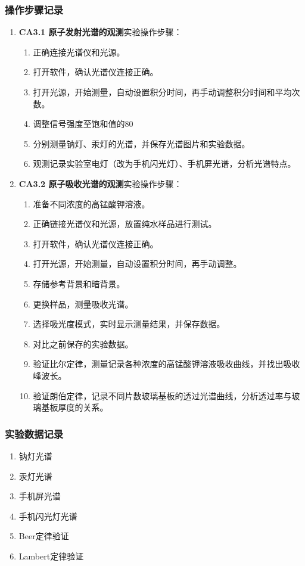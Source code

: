 \documentclass[dvipsnames, svgnames,a4paper,11pt]{article}
\begin{document}
	\subsubsection{操作步骤记录}
	\begin{enumerate}
		\item \textbf{CA3.1 原子发射光谱的观测}实验操作步骤：
		\begin{enumerate}
			\item 正确连接光谱仪和光源。
			\item 打开软件，确认光谱仪连接正确。
			\item 打开光源，开始测量，自动设置积分时间，再手动调整积分时间和平均次数。
			\item 调整信号强度至饱和值的80%
			\item 分别测量钠灯、汞灯的光谱，并保存光谱图片和实验数据。
			\item 观测记录实验室电灯（改为手机闪光灯）、手机屏光谱，分析光谱特点。
		\end{enumerate}
				
		\item \textbf{CA3.2 原子吸收光谱的观测}实验操作步骤：
		\begin{enumerate}
			\item 准备不同浓度的高锰酸钾溶液。
			\item 正确链接光谱仪和光源，放置纯水样品进行测试。
			\item 打开软件，确认光谱仪连接正确。
			\item 打开光源，开始测量，自动设置积分时间，再手动调整。
			\item 存储参考背景和暗背景。
			\item 更换样品，测量吸收光谱。
			\item 选择吸光度模式，实时显示测量结果，并保存数据。
			\item 对比之前保存的实验数据。
			\item 验证比尔定律，测量记录各种浓度的高锰酸钾溶液吸收曲线，并找出吸收峰波长。
			\item 验证朗伯定律，记录不同片数玻璃基板的透过光谱曲线，分析透过率与玻璃基板厚度的关系。
		\end{enumerate}
	\end{enumerate}	
	
	\subsubsection{实验数据记录}
	\begin{enumerate}
		\item 钠灯光谱
		\item 汞灯光谱
		\item 手机屏光谱
		\item 手机闪光灯光谱
		\item Beer定律验证
		\item Lambert定律验证
	\end{enumerate}
	
\end{document}
